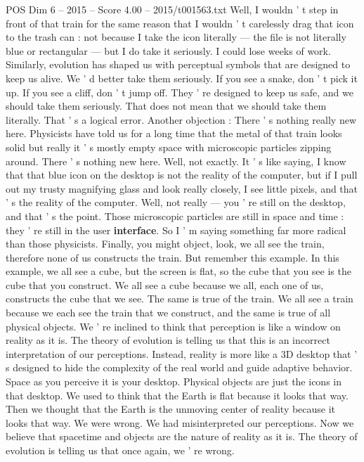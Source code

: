 \begin{textsample}{POS Dim 6 – 2015 – Score 4.00 – 2015/t001563.txt}
Well, I wouldn ' t step in front of that train for the same reason that I wouldn ' t carelessly drag that icon to the trash can : not because I take the icon literally — the file is not literally blue or rectangular — but I do take it seriously.
I could lose weeks of work.
Similarly, evolution has shaped us with perceptual symbols that are designed to keep us alive.
We ' d better take them seriously.
If you see a snake, don ' t pick it up.
If you see a cliff, don ' t jump off.
They ' re designed to keep us safe, and we should take them seriously.
That does not mean that we should take them literally.
That ' s a logical error.
Another objection : There ' s nothing really new here.
Physicists have told us for a long time that the metal of that train looks solid but really it ' s mostly empty space with microscopic particles zipping around.
There ' s nothing new here.
Well, not exactly.
It ' s like saying, I know that that blue icon on the desktop is not the reality of the computer, but if I pull out my trusty magnifying glass and look really closely, I see little pixels, and that ' s the reality of the computer.
Well, not really — you ' re still on the desktop, and that ' s the point.
Those microscopic particles are still in space and time : they ' re still in the user \textbf{interface}.
So I ' m saying something far more radical than those physicists.
Finally, you might object, look, we all see the train, therefore none of us constructs the train.
But remember this example.
In this example, we all see a cube, but the screen is flat, so the cube that you see is the cube that you construct.
We all see a cube because we all, each one of us, constructs the cube that we see.
The same is true of the train.
We all see a train because we each see the train that we construct, and the same is true of all physical objects.
We ' re inclined to think that perception is like a window on reality as it is.
The theory of evolution is telling us that this is an incorrect interpretation of our perceptions.
Instead, reality is more like a 3D desktop that ' s designed to hide the complexity of the real world and guide adaptive behavior.
Space as you perceive it is your desktop.
Physical objects are just the icons in that desktop.
We used to think that the Earth is flat because it looks that way.
Then we thought that the Earth is the unmoving center of reality because it looks that way.
We were wrong.
We had misinterpreted our perceptions.
Now we believe that spacetime and objects are the nature of reality as it is.
The theory of evolution is telling us that once again, we ' re wrong.

\end{textsample}
